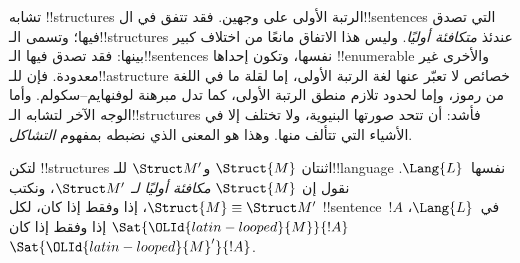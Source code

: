 \documentclass[../../../include/open-logic-section]{subfiles}
\begin{document}

تشابه !!{structure}s الرتبة الأولى على وجهين. فقد تتفق في
ال!!{sentence}s التي تصدق فيها؛ وتسمى الـ!!{structure}s عندئذ
\emph{متكافئة أوليًا}. وليس هذا الاتفاق مانعًا من اختلاف كبير
بينها: فقد تصدق فيها الـ!!{sentence}s نفسها، وتكون إحداها
!!{enumerable} والأخرى غير معدودة. فإن للـ!!a{structure} خصائص
لا تعبّر عنها لغة الرتبة الأولى، إما لقلة ما في اللغة من رموز،
وإما لحدود تلازم منطق الرتبة الأولى، كما تدل مبرهنة لوفنهايم--سكولم.
وأما الوجه الآخر لتشابه الـ!!{structure}s فأشد: أن تتحد صورتها
البنيوية، ولا تختلف إلا في الأشياء التي تتألف منها. وهذا هو
المعنى الذي نضبطه بمفهوم \emph{التشاكل}.

\begin{defn}
لتكن !!{structure}s اثنتان $\Struct{M}$ و$\Struct M'$ للـ!!{language}
نفسها~$\Lang{L}$. نقول إن $\Struct{M}$ \emph{مكافئة أوليًا لـ}
$\Struct M'$، ونكتب $\Struct{M} \equiv \Struct M'$، إذا وفقط إذا كان،
لكل !!{sentence}~$!A$ في~$\Lang{L}$، $\Sat{\OLId{latin-looped}{M}}{!A}$ إذا وفقط إذا كان
$\Sat{\OLId{latin-looped}{M}'}{!A}$.
\end{defn}
\end{document}
